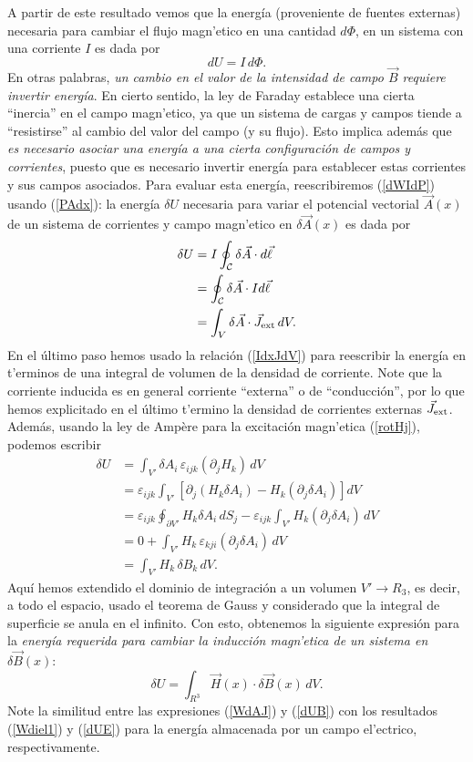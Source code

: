 A partir de este resultado vemos que la energía (proveniente de fuentes externas) necesaria para cambiar el flujo magn'etico en una cantidad $d\Phi$, en un sistema con una corriente $I$ es dada por
\begin{equation}\label{dWIdP}
 \boxed{dU=I\,d\Phi.}
\end{equation}
En otras palabras, \textit{un cambio en el valor de la intensidad de campo $\vec{B}$ requiere invertir energía}. En cierto sentido, la ley de Faraday establece una cierta ``inercia'' en el campo magn'etico, ya que un sistema de cargas y campos tiende a ``resistirse'' al cambio del valor del campo (y su flujo). 
Esto implica además que \textit{es necesario asociar una energía a una cierta configuración de campos y corrientes}, puesto que es necesario invertir energía para establecer estas corrientes y sus campos asociados. Para evaluar esta energía, reescribiremos (\ref{dWIdP}) usando (\ref{PAdx}): la energía $\delta U$ necesaria para variar el potencial vectorial $\vec{A}(x)$ de un sistema de corrientes y campo magn'etico en $\delta\vec{A}(x)$ es dada por
\begin{align}
 \delta U &= I\oint_{\cal C}\delta\vec{A}\cdot d\vec{\ell} \\
 &= \oint_{\cal C}\delta\vec{A}\cdot Id\vec{\ell} \\
 &= \int_V\delta\vec{A}\cdot \vec{J}_{\rm ext}\,dV. \label{WdAJ}
\end{align}
En el último paso hemos usado la relación (\ref{IdxJdV}) para reescribir la energía en t'erminos de una integral de volumen de la densidad de corriente. Note que la corriente inducida es en general corriente ``externa'' o de ``conducción'', por lo que hemos explicitado en el último t'ermino la densidad de corrientes externas $\vec{J}_{\rm ext}$. Además, usando la ley de Amp\`ere para la excitación magn'etica (\ref{rotHj}), podemos escribir
\begin{align}
 \delta U 
&= \int_{V'} \delta A_i\,\varepsilon_{ijk}\left(\partial_jH_k\right)\,dV \\
&= \varepsilon_{ijk}\int_{V'} \left[\partial_j(H_k\delta A_i)-H_k(\partial_j\delta A_i)\right]dV\\
&= \varepsilon_{ijk}\oint_{\partial V'}H_k\delta
A_i\,dS_j-\varepsilon_{ijk}\int_{V'}H_k(\partial_j\delta A_i)\,dV\\
&= 0+\int_{V'} H_k\,\varepsilon_{kji}(\partial_j\delta A_i)\,dV\\
&= \int_{V'} H_k\,\delta B_k\,dV.
\end{align}
Aquí hemos extendido el dominio de integración a un volumen $V'\to R_3$, es decir, a todo el espacio, usado el teorema de Gauss y considerado que la integral de superficie se anula en el infinito. Con esto, obtenemos la siguiente expresión para la \textit{energía requerida para cambiar la inducción magn'etica de un sistema en $\delta{\vec B}(x)$}:
\begin{equation}
 \boxed{\delta U=\int_{R^3} \vec{H}(x)\cdot \delta\vec{B}(x)\,dV.}\label{dUB}
\end{equation}
Note la similitud entre las expresiones (\ref{WdAJ}) y (\ref{dUB}) con los resultados (\ref{Wdiel1}) y (\ref{dUE}) para la energía almacenada por un campo el'ectrico, respectivamente.

